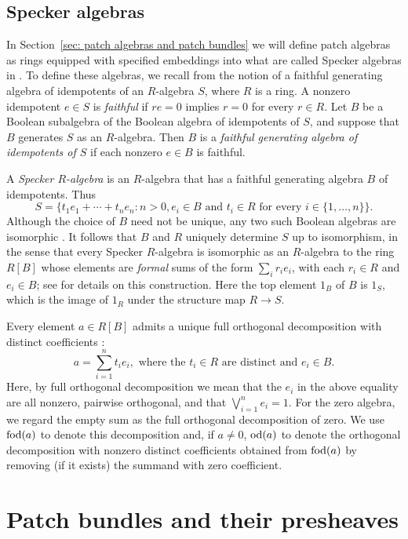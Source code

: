 \documentclass[11pt]{amsart}
\begin{document}
\subsection[Specker algebras]{Specker algebras}\label{subsec: Sepecker algebras}
In Section~\ref{sec: patch algebras and patch bundles} we will define patch algebras as rings equipped with specified embeddings into what are called Specker algebras in \cite[Definition~2.3]{BMMO}. To define these algebras, we recall from \cite[p.~185]{BMMO} the notion of a faithful generating algebra of idempotents of an $R$-algebra $S$, where $R$ is a ring. 
A nonzero idempotent $e \in S$ is {\it faithful} if $re=0$ implies $r=0$ for every $r\in R$. Let $B$ be a Boolean subalgebra of the Boolean algebra of idempotents of $S$, and suppose that $B$ generates $S$ as an $R$-algebra. Then $ B$ is a {\it faithful
generating algebra of idempotents of $S$} if each nonzero $e \in B$ is faithful. 

A {\it Specker $R$-algebra} is an $R$-algebra that has a faithful generating algebra $B$ of idempotents. Thus  \[S=\{t_1e_1 + \cdots + t_n e_n : n>0, e_i \in B\text{ and }t_i \in R \text{ for every }i\in \{1,\ldots, n\}\}.\]
Although the choice of $B$ need not be unique, any two such Boolean algebras are isomorphic \cite[Example~3.4 and Theorem~3.5]{BMMO}.
It follows that $B$ and $R$ uniquely determine $S$ up to isomorphism, in the sense that every Specker $R$-algebra is isomorphic as an $R$-algebra to the ring $R[B]$ whose elements are \textit{formal} sums of the form $\sum_i r_i{e_i}$, with each $r_i \in R$ and $e_i \in B$; see \cite[Definition~2.4 and Theorem~2.7]{BMMO} for details on this construction. Here the top element $1_B$ of $B$ is $1_S$, which is the image of $1_R$ under the structure map $R\to S$.

Every element $a\in R[B]$ admits a unique full orthogonal decomposition with distinct coefficients \cite[Lemma 2.1]{BMMO}:
    \[ a=\sum_{i=1}^n t_i e_i, \text{ where the }t_i\in R\text{ are distinct and }e_i\in B.\]
Here, by full orthogonal decomposition we mean that the $e_i$ in the above equality are all nonzero, pairwise orthogonal, and that $\bigvee_{i=1}^n e_i=1$. For the zero algebra, we regard the empty sum as the full orthogonal decomposition of zero. We use $\mbox{\rm fod}(a)$ to denote this decomposition and, if $a\ne 0$, $\mbox{\rm od}(a)$ to denote the orthogonal decomposition with nonzero distinct coefficients obtained from $\mbox{\rm fod}(a)$ by removing (if it exists) the summand with zero coefficient.

\section[Patch bundles and their presheaves]{Patch bundles and their presheaves}\label{sec: bundles and presheaves}
\end{document}
